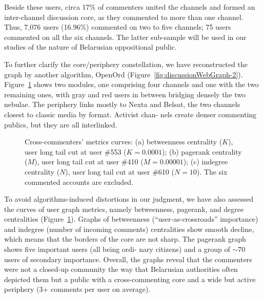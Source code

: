 Beside these users, circa 17\% of commenters united the channels and formed an inter-channel discussion core, as they commented to more than one channel. Thus, 7,076 users (16.96\%) commented on two to five channels; 75 users commented on all the six channels. The latter sub-sample will be used in our studies of the nature of Belarusian oppositional public.

To further clarify the core/periphery constellation, we have reconstructed the graph by another algorithm, OpenOrd (Figure~\cref{fig:discussionWebGraph-2}). Figure~\cref{fig:crossCommentersMetricsCurves} shows two modules, one comprising four channels and one with the two remaining ones, with gray and red users in between bridging densely the two nebulae. The periphery links mostly to Nexta and Belsat, the two channels closest to classic media by format. Activist chan- nels create denser commenting publics, but they are all interlinked.

\begin{figure}[ht]
	\caption{Cross-commenters’ metrics curves: (a) betweenness centrality (\(K\)), user long tail cut at user \#553 (\(K = 0.0001\)); (b) pagerank centrality (\(M\)), user long tail cut at user \#410 (\(M = 0.00001\)); (c) indegree centrality (\(N\)), user long tail cut at user \#610 (\(N = 10\)). The six commented accounts are excluded.}\label{fig:crossCommentersMetricsCurves}
\end{figure}

To avoid algorithms-induced distortions in our judgment, we have also assessed the curves of user graph metrics, namely betweenness, pagerank, and degree centralities (Figure~\cref{fig:crossCommentersMetricsCurves}). Graphs of betweenness (“user-as-crossroads” importance) and indegree (number of incoming comments) centralities show smooth decline, which means that the borders of the core are not sharp. The pagerank graph shows five important users (all being ordi- nary citizens) and a group of \(\sim 70\) users of secondary importance. Overall, the graphs reveal that the commenters were not a closed-up community the way that Belarusian authorities often depicted them but a public with a cross-commenting core and a wide but active periphery (3+ comments per user on average).

